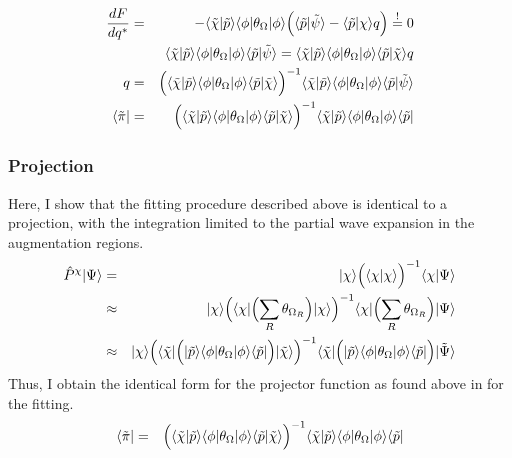 \documentclass[11pt,a4paper]{report}
\begin{document}
\begin{eqnarray}
\frac{dF}{dq^*}&=&-\langle\tilde{\chi}|\tilde{p}\rangle
\langle\phi|\theta_\Omega|\phi\rangle
\Bigl(
\langle\tilde{p}|\tilde{\psi}\rangle-\langle\tilde{p}|\chi\rangle q\Bigr)
\stackrel{!}{=}0
\nonumber\\
%
%
%
&&\langle\tilde{\chi}|\tilde{p}\rangle
\langle\phi|\theta_\Omega|\phi\rangle
\langle\tilde{p}|\tilde{\psi}\rangle
=
\langle\tilde{\chi}|\tilde{p}\rangle
\langle\phi|\theta_\Omega|\phi\rangle
\langle\tilde{p}|\tilde\chi\rangle q
\nonumber\\
%
%
%
q&=&\Bigl(\langle\tilde{\chi}|\tilde{p}\rangle
\langle\phi|\theta_\Omega|\phi\rangle
\langle\tilde{p}|\tilde{\chi}\rangle\Bigr)^{-1}
\langle\tilde{\chi}|\tilde{p}\rangle
\langle\phi|\theta_\Omega|\phi\rangle
\langle\tilde{p}|\tilde{\psi}\rangle
\nonumber\\
%
%
%
\langle\tilde{\pi}|&=&
\Bigl(\langle\tilde{\chi}|\tilde{p}\rangle
\langle\phi|\theta_\Omega|\phi\rangle
\langle\tilde{p}|\tilde{\chi}\rangle\Bigr)^{-1}
\langle\tilde{\chi}|\tilde{p}\rangle
\langle\phi|\theta_\Omega|\phi\rangle
\langle\tilde{p}|
\label{eq:orbitalprojectorbyfit}
\end{eqnarray}


\subsubsection{Projection}
Here, I show that the fitting procedure described above is identical to
a projection, with the integration limited to the partial wave
expansion in the augmentation regions.
\begin{eqnarray}
\hat{P}^\chi|\Psi\rangle
&=&|\chi\rangle\Bigl(\langle\chi|\chi\rangle\Bigr)^{-1}
\langle\chi|\Psi\rangle
\nonumber\\
%
%
&\approx&|\chi\rangle\Bigl(\langle\chi|
\Bigl(\sum_R \theta_{\Omega_R}\Bigr)
|\chi\rangle\Bigr)^{-1}
\langle\chi|\Bigl(\sum_R \theta_{\Omega_R}\Bigr)|\Psi\rangle
\nonumber\\
%
%
&\approx&|\chi\rangle\Bigl(\langle\tilde{\chi}|
\Bigl(
|\tilde{p}\rangle\langle\phi|\theta_{\Omega}|\phi\rangle\langle\tilde{p}|
\Bigr)
|\tilde{\chi}\rangle\Bigr)^{-1}
\langle\tilde{\chi}|
\Bigl(
|\tilde{p}\rangle\langle\phi|\theta_{\Omega}|\phi\rangle\langle\tilde{p}|
\Bigr)|\tilde{\Psi}\rangle
\end{eqnarray}
Thus, I obtain the identical form for the projector function as found
above in  for the fitting.
\begin{eqnarray}
\langle\tilde{\pi}|&=&\Bigl(\langle\tilde{\chi}|\tilde{p}\rangle
\langle\phi|\theta_\Omega|\phi\rangle
\langle\tilde{p}|\tilde{\chi}\rangle\Bigr)^{-1}
\langle\tilde{\chi}|\tilde{p}\rangle
\langle\phi|\theta_\Omega|\phi\rangle
\langle\tilde{p}|
\label{eq:orbitalprojectorbyprojection}
\end{eqnarray}
\end{document}
